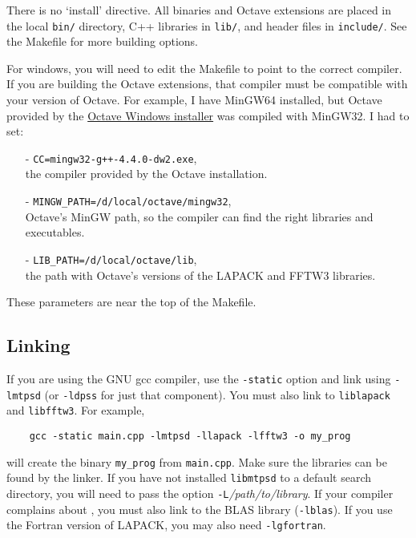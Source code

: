 \noindent There is no `install' directive.  All binaries and Octave extensions are placed in the local \texttt{bin/} directory, C++ libraries in \texttt{lib/}, and header files in \texttt{include/}.  See the Makefile for more building options.

For windows, you will need to edit the Makefile to point to the correct compiler.  If you are building the Octave extensions, that compiler must be compatible with your version of Octave.  For example, I have MinGW64 installed, but Octave provided by the \href{http://sourceforge.net/projects/octave/files/Octave_Windows\%20-\%20MinGW/Octave\%203.2.4\%20for\%20Windows\%20MinGW32\%20Installer/}{Octave Windows installer} was compiled with MinGW32.  I had to set:
\begin{itemize}
    \item[-] \texttt{CC=mingw32-g++-4.4.0-dw2.exe},\\
        the compiler provided by the Octave installation.
    \item[-] \texttt{MINGW\_PATH=/d/local/octave/mingw32},\\
        Octave's MinGW path, so the compiler can find the right libraries and executables.
    \item[-] \texttt{LIB\_PATH=/d/local/octave/lib},\\
        the path with Octave's versions of the LAPACK and FFTW3 libraries.
\end{itemize}
These parameters are near the top of the Makefile.

\subsection{Linking}

If you are using the GNU gcc compiler, use the \texttt{-static} option and link using \texttt{-lmtpsd} (or \texttt{-ldpss} for just that component).  You must also link to \texttt{liblapack} and \texttt{libfftw3}.  For example,
\begin{verbatim}
    gcc -static main.cpp -lmtpsd -llapack -lfftw3 -o my_prog
\end{verbatim}
will create the binary \texttt{my\_prog} from \texttt{main.cpp}.  Make sure the libraries can be found by the linker.  If you have not installed \texttt{libmtpsd} to a default search directory, you will need to pass the option \texttt{-L}\textit{/path/to/library}.  If your compiler complains about , you must also link to the BLAS library (\texttt{-lblas}).  If you use the Fortran version of LAPACK, you may also need \texttt{-lgfortran}.

